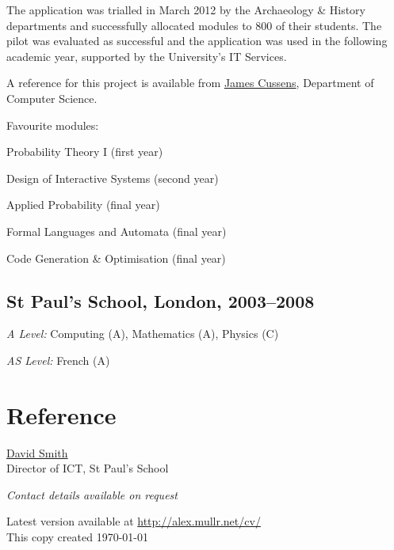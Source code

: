 \documentclass[10pt,a4paper]{article}
\renewenvironment{itemize}{
  \begin{list}{}{
    \setlength{\leftmargin}{1em}
    \setlength{\itemsep}{0em}
    \setlength{\parskip}{0pt}
    \setlength{\parsep}{0.2em}
  }
}{
  \end{list}
}
\begin{document}
The application was trialled in March 2012 by the Archaeology \& History
departments and successfully allocated modules to 800 of their students. The
pilot was evaluated as successful and the application was used in the
following academic year, supported by the University's IT Services.

A reference for this project is available from
\href{http://www-users.cs.york.ac.uk/~jc/}{James Cussens}, Department of
Computer Science.


\medskip

\begin{small}
  Favourite modules:
  \begin{itemize}
    \item Probability Theory I (first year)
    \item Design of Interactive Systems (second year)
    \item Applied Probability (final year)
    \item Formal Languages and Automata (final year)
    \item Code Generation \& Optimisation (final year)
  \end{itemize}
\end{small}

\subsection*{St Paul's School, London, 2003--2008}

\begin{itemize}
  \item \textit{A Level:} Computing (A), Mathematics (A), Physics (C)
  \begin{small}
    \item \textit{AS Level:} French (A)
  \end{small}
\end{itemize}

\section*{Reference}

\href{http://preoccupations.org/}{David Smith} \\
Director of ICT, St Paul's School

\begin{small}
  \emph{Contact details available on request}
\end{small}

\medskip

\begin{flushright}
  \begin{footnotesize}
    Latest version available at \url{http://alex.mullr.net/cv/} \\
    This copy created \today
  \end{footnotesize}
\end{flushright}
\end{document}
